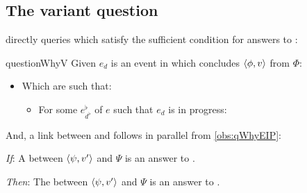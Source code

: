 \subsection{The variant question}
\label{cha:var:qwhyvnp:question}



\begin{note}
  \qWhyV{} directly queries \ros{} which satisfy the sufficient condition for answers to \qWhy{}:

  \begin{question}{questionWhyV}{\qWhyV{}}%
    Given \(e_{d}\) is an event in which \vAgent{} concludes \(\langle \phi, v \rangle\) from \(\Phi\):

    \begin{itemize}
    \item
      Which  are such that:
      \begin{itemize}
      \item
        For some  \(e^{\flat}_{d^{\flat}}\) of \(e\) such that \(e_{d}\) is in progress:
      \end{itemize}
    \end{itemize}
    \vspace{-1.5\baselineskip}
  \end{question}

  \noindent%
  And, a link between \qWhy{} and \qWhyV{} follows in parallel from \autoref{obs:qWhyEIP}:

  \begin{link}%
    \label{link:why:support:pvpp}%
    \vspace{-\baselineskip}
    \begin{itenum}
    \item[\emph{If}:]
      A \ros{} between \(\langle \psi, v' \rangle\) and \(\Psi\) is an answer to \qWhyV{}.
    \item[\emph{Then}:]
      The \ros{} between \(\langle \psi, v' \rangle\) and \(\Psi\) is an answer to \qWhy{}.
    \end{itenum}
    \vspace{-\baselineskip}
  \end{link}
\end{note}


